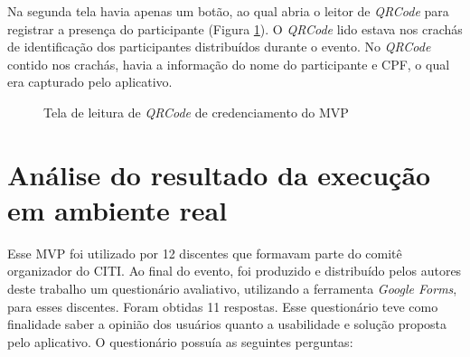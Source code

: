 Na segunda tela havia apenas um botão, ao qual abria o leitor de \textit{QRCode} para registrar a presença do participante (Figura \ref{fig:mvp2}). O \textit{QRCode} lido estava nos crachás de identificação dos participantes distribuídos durante o evento. No \textit{QRCode} contido nos crachás, havia a informação do nome do participante e CPF, o qual era capturado pelo aplicativo.

\begin{figure}[H]
    \centering
    \caption{Tela de leitura de \textit{QRCode} de credenciamento do MVP}
    \label{fig:mvp2}
\end{figure}

\section{Análise do resultado da execução em ambiente real}

Esse MVP foi utilizado por 12 discentes que formavam parte do comitê organizador do CITI. Ao final do evento, foi produzido e distribuído pelos autores deste trabalho um questionário avaliativo, utilizando a ferramenta \textit{Google Forms}, para esses discentes. Foram obtidas 11 respostas. Esse questionário teve como finalidade saber a opinião dos usuários quanto a usabilidade e solução proposta pelo aplicativo. O questionário possuía as seguintes perguntas:


